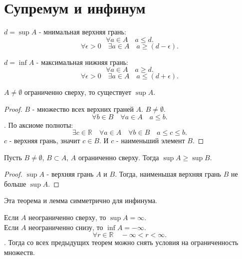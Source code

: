 \documentclass[11pt, oneside]{article}   	%
\begin{document}
\section{Супремум и инфинум}
    \begin{definition}
        $d=\sup A$ - мнимальная верхняя грань:
        \[ \forall{a \in A}\quad a\le   d.\] 
        \[\forall{\epsilon > 0}\quad \exists{a \in A}\quad a\ge  (d-\epsilon) .\] 
    \end{definition}
    \begin{definition}
        $d=\inf A$ - максимальная нижняя грань:
    \[ \forall{a \in A}\quad a\ge  d.\] 
    \[\forall{\epsilon > 0}\quad \exists{a \in A}\quad a\le (d+\epsilon) .\] 
    \end{definition}
    \begin{theorem}
        $A \neq \emptyset$ ограниченно сверху, то существует $\sup A$.
         \begin{proof}
            $B$ - множество всех верхних граней  $A$.  $B \neq \emptyset$.
            \[ \forall{b \in B}\quad \forall{a \in A}\quad a\le b .\].
            По аксиоме полноты:
            \[ \exists{c \in \mathbb{R}}\quad \forall{a \in A}\quad \forall{b \in B}\quad a\le c\le b .\] 
            $c$ - верхняя грань, значит  $c \in B$. И $c$ - наименьший элемент  $B$.
        \end{proof}
        
    \end{theorem}
    \begin{tlemma}
        Пусть $B \neq \emptyset$, $B \subset A$, $A$ ограниченно сверху. Тогда  $\sup A \ge \sup B$.\\
        \begin{proof}
            $\sup A$ - верхняя грань  $A$ и $B$. Тогда, наименьшая верхняя грань  $B$ не больше  $\sup A$.
        \end{proof}
    \end{tlemma}
    Эта теорема и лемма симметрично для инфинума.
    \begin{definition}
        Если $A$ неограниченно сверху, то  $\sup A = \infty$.\\
        Если $A$ неограниченно снизу, то  $\inf A = -\infty$.
        \[ \forall{r \in \mathbb{R}}\quad -\infty < r < \infty .\].
        Тогда со всех предыдущих теорем можно снять условия на ограниченность множеств.
    \end{definition}
\end{document}

